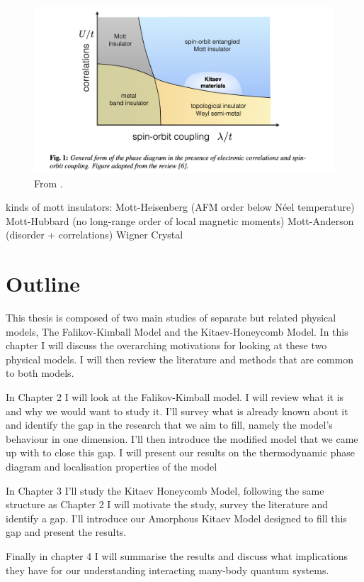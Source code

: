 \hypertarget{fig:correlation_spin_orbit_PT}{%
\begin{figure}
\centering
\includegraphics[width=1\textwidth,height=\textheight]{figure_code/intro_chapter/correlation_spin_orbit_PT.png}
\caption[{Phase Diagram}]{From \autocite{TrebstPhysRep2022}.}
\label{fig:correlation_spin_orbit_PT}
\end{figure}
}

kinds of mott insulators: Mott-Heisenberg (AFM order below Néel temperature) Mott-Hubbard (no long-range order of local magnetic moments) Mott-Anderson (disorder + correlations) Wigner Crystal

\hypertarget{outline}{%
\section{Outline}\label{outline}}

This thesis is composed of two main studies of separate but related physical models, The Falikov-Kimball Model and the Kitaev-Honeycomb Model. In this chapter I will discuss the overarching motivations for looking at these two physical models. I will then review the literature and methods that are common to both models.

In Chapter 2 I will look at the Falikov-Kimball model. I will review what it is and why we would want to study it. I'll survey what is already known about it and identify the gap in the research that we aim to fill, namely the model's behaviour in one dimension. I'll then introduce the modified model that we came up with to close this gap. I will present our results on the thermodynamic phase diagram and localisation properties of the model

In Chapter 3 I'll study the Kitaev Honeycomb Model, following the same structure as Chapter 2 I will motivate the study, survey the literature and identify a gap. I'll introduce our Amorphous Kitaev Model designed to fill this gap and present the results.

Finally in chapter 4 I will summarise the results and discuss what implications they have for our understanding interacting many-body quantum systems.
